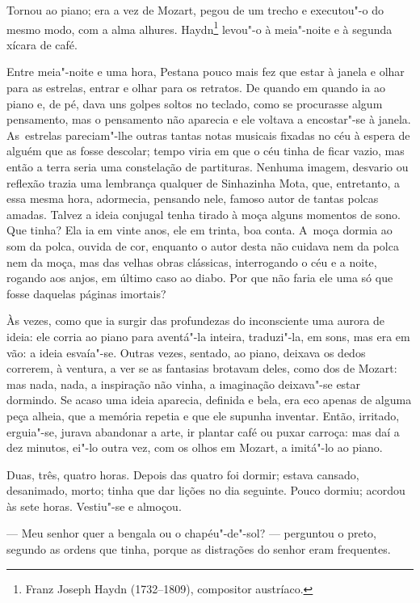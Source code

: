 \begin{linenumbers}
Tornou ao piano; era a vez de Mozart, pegou de um trecho e executou"-o do
mesmo modo, com a alma alhures. Haydn\footnote{Franz Joseph Haydn
  (1732--1809), compositor austríaco.} levou"-o à meia"-noite e à segunda
xícara de café.

Entre meia"-noite e uma hora, Pestana pouco mais fez que estar à janela e
olhar para as estrelas, entrar e olhar para os retratos. De quando em
quando ia ao piano e, de pé, dava uns golpes soltos no teclado, como se
procurasse algum pensamento, mas o pensamento não aparecia e ele voltava
a encostar"-se à janela. As~estrelas pareciam"-lhe outras tantas notas
musicais fixadas no céu à espera de alguém que as fosse descolar; tempo
viria em que o céu tinha de ficar vazio, mas então a terra seria uma
constelação de partituras. Nenhuma imagem, desvario ou reflexão trazia
uma lembrança qualquer de Sinhazinha Mota, que, entretanto, a essa mesma
hora, adormecia, pensando nele, famoso autor de tantas polcas amadas.
Talvez a ideia conjugal tenha tirado à moça alguns momentos de sono. Que
tinha? Ela ia em vinte anos, ele em trinta, boa conta. A~moça dormia ao
som da polca, ouvida de cor, enquanto o autor desta não cuidava nem da
polca nem da moça, mas das velhas obras clássicas, interrogando o céu e
a noite, rogando aos anjos, em último caso ao diabo. Por que não faria
ele uma só que fosse daquelas páginas imortais?

Às vezes, como que ia surgir das profundezas do inconsciente uma aurora
de ideia: ele corria ao piano para aventá"-la inteira, traduzi"-la, em
sons, mas era em vão: a ideia esvaía"-se. Outras vezes, sentado, ao
piano, deixava os dedos correrem, à ventura, a ver se as fantasias
brotavam deles, como dos de Mozart: mas nada, nada, a inspiração não
vinha, a imaginação deixava"-se estar dormindo. Se acaso uma ideia
aparecia, definida e bela, era eco apenas de alguma peça alheia, que a
memória repetia e que ele supunha inventar. Então, irritado, erguia"-se,
jurava abandonar a arte, ir plantar café ou puxar carroça: mas daí a dez
minutos, ei"-lo outra vez, com os olhos em Mozart, a imitá"-lo ao piano.

Duas, três, quatro horas. Depois das quatro foi dormir; estava cansado,
desanimado, morto; tinha que dar lições no dia seguinte. Pouco dormiu;
acordou às sete horas. Vestiu"-se e almoçou.

--- Meu senhor quer a bengala ou o chapéu"-de"-sol? --- perguntou o preto,
segundo as ordens que tinha, porque as distrações do senhor eram
frequentes.


\end{linenumbers}
